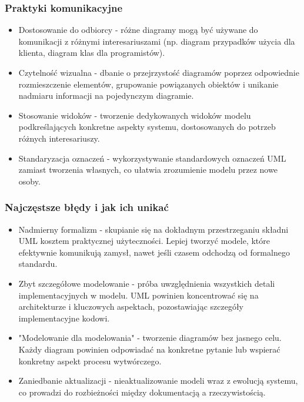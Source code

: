 \documentclass[12pt,a4paper]{article}
\begin{document}
\subsubsection{Praktyki komunikacyjne}
\begin{itemize}
    \item Dostosowanie do odbiorcy - różne diagramy mogą być używane do komunikacji z różnymi interesariuszami (np. diagram przypadków użycia dla klienta, diagram klas dla programistów).
    
    \item Czytelność wizualna - dbanie o przejrzystość diagramów poprzez odpowiednie rozmieszczenie elementów, grupowanie powiązanych obiektów i unikanie nadmiaru informacji na pojedynczym diagramie.
    
    \item Stosowanie widoków - tworzenie dedykowanych widoków modelu podkreślających konkretne aspekty systemu, dostosowanych do potrzeb różnych interesariuszy.
    
    \item Standaryzacja oznaczeń - wykorzystywanie standardowych oznaczeń UML zamiast tworzenia własnych, co ułatwia zrozumienie modelu przez nowe osoby.
\end{itemize}

\subsubsection{Najczęstsze błędy i jak ich unikać}
\begin{itemize}
    \item Nadmierny formalizm - skupianie się na dokładnym przestrzeganiu składni UML kosztem praktycznej użyteczności. Lepiej tworzyć modele, które efektywnie komunikują zamysł, nawet jeśli czasem odchodzą od formalnego standardu.
    
    \item Zbyt szczegółowe modelowanie - próba uwzględnienia wszystkich detali implementacyjnych w modelu. UML powinien koncentrować się na architekturze i kluczowych aspektach, pozostawiając szczegóły implementacyjne kodowi.
    
    \item "Modelowanie dla modelowania" - tworzenie diagramów bez jasnego celu. Każdy diagram powinien odpowiadać na konkretne pytanie lub wspierać konkretny aspekt procesu wytwórczego.
    
    \item Zaniedbanie aktualizacji - nieaktualizowanie modeli wraz z ewolucją systemu, co prowadzi do rozbieżności między dokumentacją a rzeczywistością.
\end{itemize}
\end{document}
